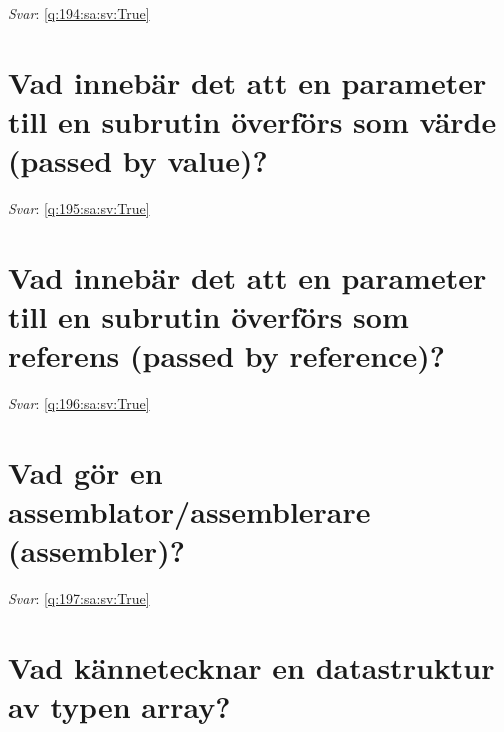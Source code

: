 \documentclass[a4paper,11pt,oneside]{book}
\begin{document}
\begin{sloppypar}
\noindent\makebox[\textwidth]{\hrulefill}

\vspace{1cm}

\textit{Svar}: \autoref{q:194:sa:sv:True}



\section{Vad inneb\"ar det att en parameter till en subrutin \"overf\"ors som v\"arde (passed by value)?}

\label{q:195:sa:sv:False}

\vspace{2cm}

\noindent\makebox[\textwidth]{\hrulefill}

\vspace{1cm}

\textit{Svar}: \autoref{q:195:sa:sv:True}



\section{Vad inneb\"ar det att en parameter till en subrutin \"overf\"ors som referens (passed by reference)?}

\label{q:196:sa:sv:False}

\vspace{2cm}

\noindent\makebox[\textwidth]{\hrulefill}

\vspace{1cm}

\textit{Svar}: \autoref{q:196:sa:sv:True}



\section{Vad g\"or en assemblator/assemblerare (assembler)?}

\label{q:197:sa:sv:False}

\vspace{2cm}

\noindent\makebox[\textwidth]{\hrulefill}

\vspace{1cm}

\textit{Svar}: \autoref{q:197:sa:sv:True}



\section{Vad k\"annetecknar en datastruktur av typen array?}


\end{sloppypar}
\end{document}
